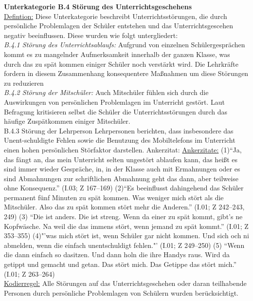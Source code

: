 \textbf{Unterkategorie B.4 Störung des Unterrichtsgeschehens}\\
\underline{Defintion:} Diese Unterkategorie beschreibt Unterrichtsstörungen, die durch persönliche Problemlagen der Schüler entstehen und das Unterrichtsgescehen negativ beeinflussen. Diese wurden wie folgt untergliedert: \\
\textit{B.4.1 Störung des Unterrichtsablaufs:} Aufgrund von einzelnen Schülergesprächen kommt es zu mangelnder Aufmerksamkeit innerhalb der ganzen Klasse, was durch das zu spät kommen einiger Schüler noch verstärkt wird. Die Lehrkräfte fordern in diesem Zusammenhang konsequentere Maßnahmen um diese Störungen zu reduzieren \\
\textit{B.4.2 Störung der Mitschüler:} Auch Mitschüler fühlen sich durch die Auswirkungen von persönlichen Problemlagen im Unterricht gestört. Laut Befragung kritisieren selbst die Schüler die Unterrichtsstörungen durch das häufige Zuspätkommen einiger Mitschüler.\\
B.4.3 Störung der Lehrperson Lehrpersonen berichten, dass insbesondere das Unent-schuldigte Fehlen sowie die Benutzung des Mobiltelefons im Unterricht einen hohen persönlichen Störfaktor darstellen. 
Ankerzitat: 
\underline{Ankerzitate:} (1)"`Ja, das fängt an, das mein Unterricht selten ungestört ablaufen kann, das heißt es sind immer wieder Gespräche, in, in der Klasse auch mit Ermahnungen oder es sind Abmahnungen zur schriftlichen Abmahnung geht das dann, aber teilweise ohne Konsequenz."' (I.03; Z 167--169) (2)"`Es beeinflusst dahingehend das Schüler permanent fünf Minuten zu spät kommen. Was weniger mich stört als die Mitschüler. Also das zu spät kommen stört mehr die Anderen."' (I.01; Z 242--243, 249) (3) "`Die ist anders. Die ist streng. Wenn da einer zu spät kommt, gibt’s ne Kopfwäsche. Na weil die das immens stört, wenn jemand zu spät kommt."' (I.01; Z 353--355) (4)"'was mich stört ist, wenn Schüler gar nicht kommen. Und sich och ni abmelden, wenn die einfach unentschuldigt fehlen."' (I.01; Z 249--250) (5) "`Wenn die dann einfach so dasitzen. Und dann holn die ihre Handys raus. Wird da getippt und gemacht und getan. Das stört mich. Das Getippe das stört mich."' (I.01; Z 263--264)\\
\underline{Kodierregel:}  Alle Störungen auf das Unterrichtsgeschehen oder daran teilhabende Personen durch persönliche Problemlagen von Schülern wurden berücksichtigt.\\

